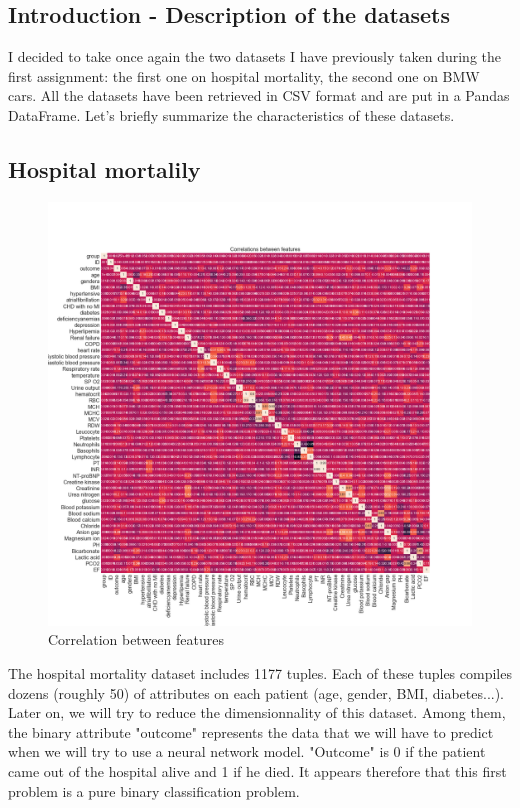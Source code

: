 \documentclass[15pt]{article}
\begin{document}
\begin{multicols}{2}

\section{Introduction - Description of the datasets}

I decided to take once again the two datasets I have previously taken during the first assignment: the first one on hospital mortality, the second one on BMW cars. All the datasets have been retrieved in CSV format and are put in a Pandas DataFrame. Let's briefly summarize the characteristics of these datasets.

\subsection{Hospital mortalily}

\begin{figure}[H]
\centering
\includegraphics[width = \columnwidth]{corrFeatures.png}
\caption{Correlation between features}
\end{figure}

The hospital mortality dataset includes 1177 tuples. Each of these tuples compiles dozens (roughly 50) of attributes on each patient (age, gender, BMI, diabetes...). Later on, we will try to reduce the dimensionnality of this dataset. Among them, the binary attribute "outcome" represents the data that we will have to predict when we will try to use a neural network model. "Outcome" is 0 if the patient came out of the hospital alive and 1 if he died. It appears therefore that this first problem is a pure binary classification problem.


\end{multicols}
\end{document}
